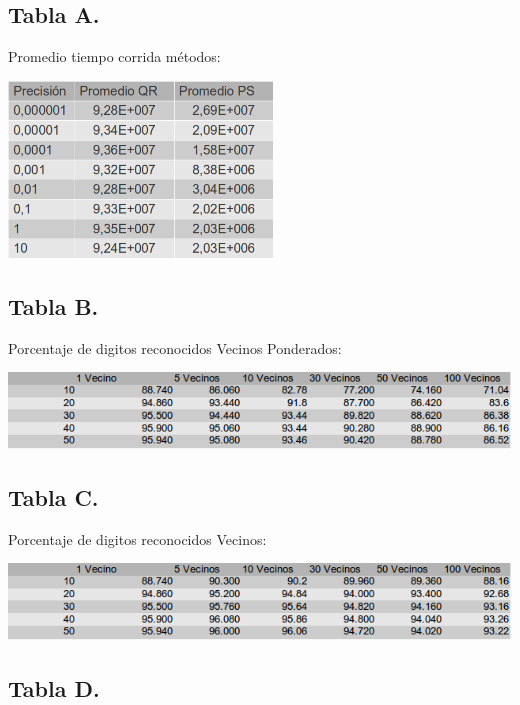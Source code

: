 \subsection{Tabla A.}
	
	Promedio tiempo corrida m\'etodos:

	\vspace{5mm}
	\centerline{\includegraphics[width=7cm]{img/tiempoPromedio.png}}
	\vspace{5mm}

\subsection{Tabla B.}
	
	Porcentaje de digitos reconocidos Vecinos Ponderados:

	\vspace{5mm}
	\centerline{\includegraphics[width=14cm]{img/kVecinosPonderadosPs.png}}

\subsection{Tabla C.}
	
	Porcentaje de digitos reconocidos Vecinos:

	\vspace{5mm}
	\centerline{\includegraphics[width=14cm]{img/kVecinosPs.png}}

\subsection{Tabla D.}
	
